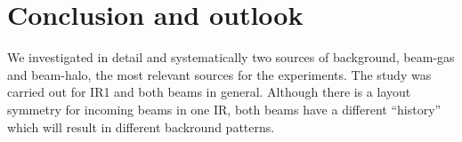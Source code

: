 \section{Conclusion and outlook}

We investigated in detail and systematically two sources of background, beam-gas and beam-halo, the most relevant sources for the experiments. The study was carried out for IR1 and both beams in general. Although there is a layout symmetry for incoming beams in one IR, both beams have a different ``history'' which will result in different backround patterns. 
